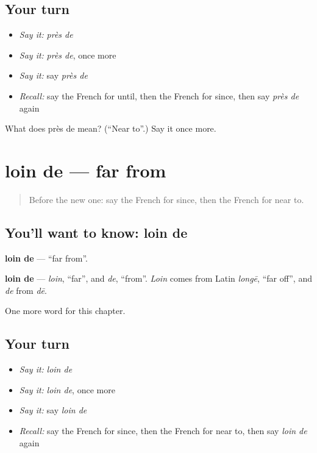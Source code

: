 \subsection*{Your turn}
\begin{itemize}
\raggedright
  \item \emph{Say it:} \emph{près de}
  \item \emph{Say it:} \emph{près de}, once more
  \item \emph{Say it:} say \emph{près de}
  \item \emph{Recall:} say the French for until, then the French for since, then say \emph{près de} again
\end{itemize}

\begin{tcolorbox}[breakable,colback=teal!4,colframe=teal!35!black,title={Before you move on}]
What does près de mean? (\textquotedblleft{}Near to\textquotedblright{}.) Say it once more.
\end{tcolorbox}
\section[loin de]{loin de — far from}

\label{lesson:FR-C188-loin-de}



\begin{quote}
Before the new one: say the French for since, then the French for near to.
\end{quote}

\subsection*{You'll want to know: loin de}
\textbf{loin de} — \textquotedblleft{}far from\textquotedblright{}.

\begin{cousinweb}
\textbf{loin de} — \emph{loin}, \textquotedblleft{}far\textquotedblright{}, and \emph{de}, \textquotedblleft{}from\textquotedblright{}. \emph{Loin} comes from Latin \emph{longē}, \textquotedblleft{}far off\textquotedblright{}, and \emph{de} from \emph{dē}.
\end{cousinweb}

\begin{grammarlens}[title={What you've built}]
One more word for this chapter.
\end{grammarlens}

\subsection*{Your turn}
\begin{itemize}
\raggedright
  \item \emph{Say it:} \emph{loin de}
  \item \emph{Say it:} \emph{loin de}, once more
  \item \emph{Say it:} say \emph{loin de}
  \item \emph{Recall:} say the French for since, then the French for near to, then say \emph{loin de} again
\end{itemize}

